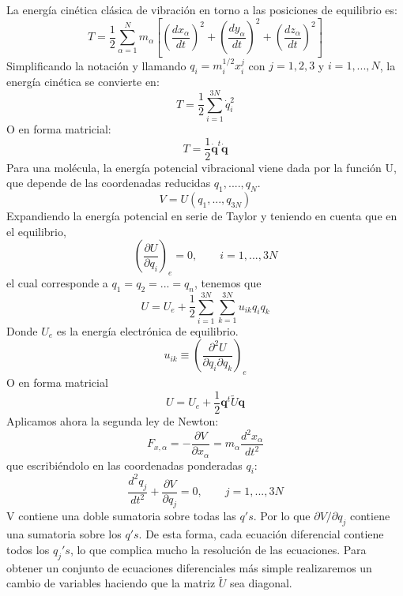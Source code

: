 \documentclass[a4paper]{article}
\begin{document}
La energía cinética clásica de vibración en torno a las posiciones de equilibrio es:
\begin{equation}
T= \frac{1}{2}\sum_{\alpha = 1}^Nm_\alpha\left[\left(\frac{dx_\alpha}{dt}\right)^2+\left(\frac{dy_\alpha}{dt}\right)^2+\left(\frac{dz_\alpha}{dt}\right)^2\right]
\end{equation}
Simplificando la notación y llamando $q_i=m_i^{1/2}x_i^j$ con $j=1,2,3$ y $i=1,...,N$, la energía cinética se convierte en:
\begin{equation}
T=\frac{1}{2}\sum_{i=1}^{3N}\dot q_i^2
\end{equation}
O en forma matricial:
\begin{equation}
T=\frac{1}{2}\boldsymbol {\dot q}^t\boldsymbol {\dot q}
\end{equation}
Para una molécula, la energía potencial vibracional viene dada por la función U, que depende de las coordenadas reducidas $q_1,....,q_N$.
\begin{equation}
V=U(q_1,...,q_{3N})
\end{equation}
Expandiendo la energía potencial en serie de Taylor y teniendo en cuenta que en el equilibrio,
\begin{equation}
\left(\frac{\partial U}{\partial q_i}\right)_e=0, \qquad i= 1,...,3N
\end{equation}
el cual corresponde a $q_1=q_2=...=q_n$, tenemos que
\begin{equation}
U = U_e + \frac{1}{2}\sum_{i=1}^{3N}\sum_{k=1}^{3N}u_{ik}q_iq_k
\end{equation}
Donde $U_e$ es la energía electrónica de equilibrio.
\begin{equation}
u_{ik} \equiv \left(\frac{\partial^2U}{\partial q_i \partial q_k}\right)_e
\end{equation}
O en forma matricial
\begin{equation}
U=U_e+\frac{1}{2}\boldsymbol q^t\tilde U\boldsymbol q
\end{equation}
Aplicamos ahora la segunda ley de Newton:
\begin{equation}
F_{x,\alpha}=-\frac{\partial V}{\partial x_\alpha}=m_\alpha\frac{d^2x_\alpha}{dt^2}
\end{equation}
que escribiéndolo en las coordenadas ponderadas $q_i$:
\begin{equation}
\frac{d^2q_j}{dt^2}+\frac{\partial V}{\partial q_j}= 0, \qquad j=1,...,3N
\end{equation}
V contiene una doble sumatoria sobre todas las $q's$. Por lo que $\partial V/\partial q_j$ contiene una sumatoria sobre los $q's$. De esta forma, cada ecuación diferencial contiene todos los $q_j's$, lo que complica mucho la resolución de las ecuaciones. Para obtener un conjunto de ecuaciones diferenciales más simple realizaremos un cambio de variables haciendo que la matriz $\tilde U$ sea diagonal.
\end{document}

